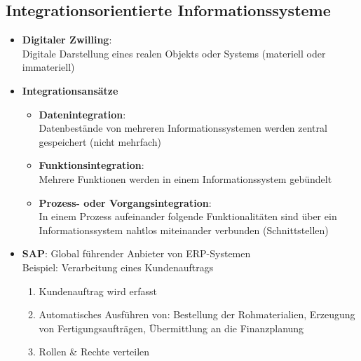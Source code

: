 \documentclass[12pt,a4paper]{article}
\begin{document}
\subsection{Integrationsorientierte Informationssysteme} %
\begin{itemize}
   \item \textbf{Digitaler Zwilling}:\\
         Digitale Darstellung eines realen Objekts oder Systems (materiell oder immateriell)

   \item \textbf{Integrationsansätze}
      \begin{itemize}
			\item \textbf{Datenintegration}:\\
			      Datenbestände von mehreren Informationssystemen werden zentral gespeichert (nicht mehrfach)
			\item \textbf{Funktionsintegration}:\\
			      Mehrere Funktionen werden in einem Informationssystem gebündelt
			\item \textbf{Prozess- oder Vorgangsintegration}:\\
			      In einem Prozess aufeinander folgende Funktionalitäten sind über ein Informationssystem nahtlos miteinander verbunden (Schnittstellen)
		\end{itemize}

   \item \textbf{SAP}: Global führender Anbieter von ERP-Systemen\\
         Beispiel: Verarbeitung eines Kundenauftrags
      \begin{enumerate}
			\item Kundenauftrag wird erfasst
			\item Automatisches Ausführen von: Bestellung der Rohmaterialien, Erzeugung von Fertigungsaufträgen, Übermittlung an die Finanzplanung
			\item Rollen \& Rechte verteilen
      \end{enumerate}


\end{itemize}
\end{document}
